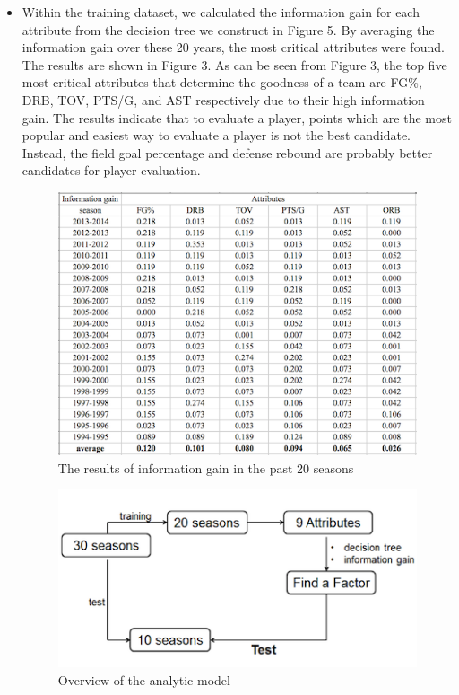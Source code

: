 \documentclass{acm_proc_article-sp}
\begin{document}
\begin{itemize}
\item Within the training dataset, we calculated the information gain for each attribute from the decision tree we construct in Figure 5. By averaging the information gain over these 20 years, the most critical attributes were found. The results are shown in Figure 3. As can be seen from Figure 3, the top five most critical attributes that determine the goodness of a team are FG\%, DRB, TOV, PTS/G, and AST respectively due to their high information gain. The results indicate that to evaluate a player, points which are the most popular and easiest way to evaluate a player is not the best candidate. Instead, the field goal percentage and defense rebound are probably better candidates for player evaluation. 

\begin{figure}[!htb]
\centering
\includegraphics{Fig-24.png}
\caption{The results of information gain in the past 20 seasons}
\end{figure}

\begin{figure}[!htb]
\centering
\includegraphics{Fig-5.png}
\caption{Overview of the analytic model}
\end{figure}


\end{itemize}
\end{document}
